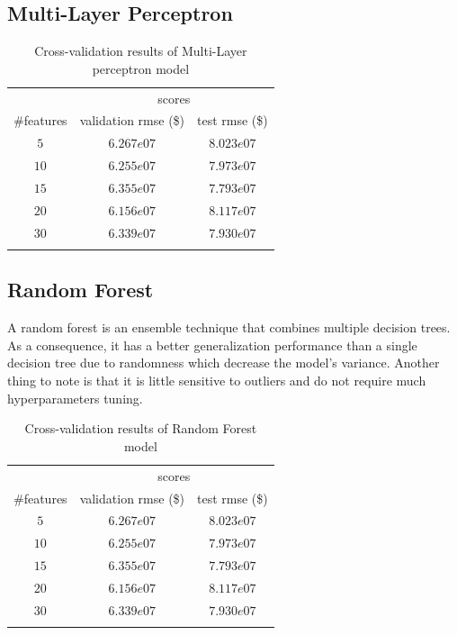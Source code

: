 \subsection{Multi-Layer Perceptron}

\begin{table}[H]
	\centering
	\begin{tabular}{ccc} \toprule
	  & \multicolumn {2}{c}{scores} \\\cmidrule(lr) {2-3}
	  \#features         & validation rmse (\$)             & test rmse (\$) \\\hline
	  $5$        		& $6.267e07	$                      	& $8.023e07$ \\
	  $10$        		& $6.255e07$                        & $7.973e07$ \\
	  $15$        		& $6.355e07$                        & $7.793e07$ \\
	  $20$             	& $6.156e07$                        & $8.117e07$ \\
	  $30$             	& $6.339e07$                        & $7.930e07$ \\
	  \\\hline
	\end{tabular}
	\caption{Cross-validation results of Multi-Layer perceptron model}
	\label{tab:mlp-results}
\end{table}

\subsection{Random Forest}

A random forest is an ensemble technique that combines multiple decision trees. As a consequence, it has a better generalization performance than a single decision tree due to randomness which decrease the model's variance. Another thing to note is that it is little sensitive to outliers and do not require much hyperparameters tuning.

\begin{table}[H]
	\centering
	\begin{tabular}{ccc} \toprule
	  & \multicolumn {2}{c}{scores} \\\cmidrule(lr) {2-3}
	  \#features         & validation rmse (\$)             & test rmse (\$) \\\hline
	  $5$        		& $6.267e07	$                      	& $8.023e07$ \\
	  $10$        		& $6.255e07$                        & $7.973e07$ \\
	  $15$        		& $6.355e07$                        & $7.793e07$ \\
	  $20$             	& $6.156e07$                        & $8.117e07$ \\
	  $30$             	& $6.339e07$                        & $7.930e07$ \\
	  \\\hline
	\end{tabular}
	\caption{Cross-validation results of Random Forest model}
	\label{tab:rf-results}
\end{table}